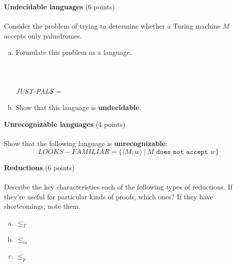 \documentclass[12pt]{article}
\newenvironment{question}[2][Question]{\begin{trivlist}
\item[\hskip \labelsep {\bfseries #1}\hskip \labelsep {\bfseries #2.}]}{\end{trivlist}}
\begin{document}
\clearpage


\begin{question}{4}\textbf{Undecidable languages} (6 points)\\\\
Consider the problem of trying to determine whether a Turing machine $M$ accepts only palindromes.
\begin{enumerate}[(a)]
\item Formulate this problem as a language.\\\\\\\\
\textit{JUST-PALS =}\hfill
\vspace{4em}
\item Show that this language is \textbf{undecidable}.
\end{enumerate}
\end{question}

\clearpage

\begin{question}{5}\textbf{Unrecognizable languages} (4 points)\\\\
Show that the following language is \textbf{unrecognizable}:
\[LOOKS-FAMILIAR = \{\langle M,w\rangle \ | \ M \texttt{ does not accept } w\}\]
\end{question}
\clearpage

\begin{question}{6}\textbf{Reductions} (6 points)\\\\
Describe the key characteristics each of the following types of reductions. If they're useful for particular kinds of proofs, which ones? If they have shortcomings, note them. 
\begin{enumerate}[(a)]
	\item $\le_T$ 
	\vspace{12em}
	
	\item $\le_m$ 
	\vspace{12em}
	
	\item $\le_p$ 
	
	
\end{enumerate}
\end{question}
\end{document}
